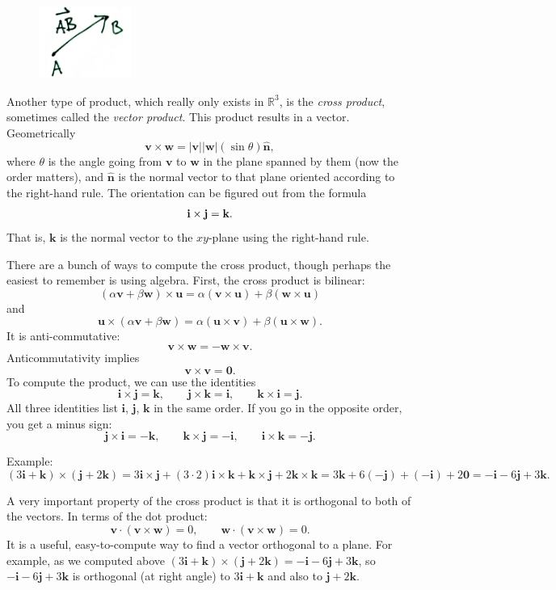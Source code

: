 \documentclass[12pt]{article}
\newcommand{\sabs}[1]{\lvert {#1} \rvert}
\newcommand{\R}{{\mathbb{R}}}
\newcommand{\veci}{\mathbf{i}}
\newcommand{\vecj}{\mathbf{j}}
\newcommand{\veck}{\mathbf{k}}
\newcommand{\avoidbreak}{\postdisplaypenalty=100}
\begin{document}
\begin{figure}
\vspace*{-0.2in}
\includegraphics[width=1.2in,page=3]{figures1}
\end{figure}
Another type of product, which really only exists in $\R^3$, is the
\emph{cross product},
sometimes called the \emph{vector product}.
This product results in a vector.
Geometrically
\[
\mathbf{v} \times \mathbf{w} = \sabs{\mathbf{v}} \sabs{\mathbf{w}} (\sin \theta) \hat{\mathbf{n}} ,
\]
where $\theta$ is the angle going from $\mathbf{v}$ to $\mathbf{w}$ in the plane spanned by them
(now the order matters),
and $\hat{\mathbf{n}}$ is the normal vector to that plane oriented according to the right-hand rule.
The orientation can be figured out from the formula
\[
\veci \times \vecj = \veck .
\avoidbreak
\]
That is, $\veck$ is the normal vector to the $xy$-plane using the right-hand rule.

There are a bunch of ways to compute the cross product, though perhaps the easiest to remember
is using algebra.
First, the cross product is bilinear:
\[
( \alpha \mathbf{v} + \beta \mathbf{w} ) \times \mathbf{u}
=
\alpha (\mathbf{v} \times \mathbf{u}) + \beta (\mathbf{w} \times \mathbf{u})
\]
and
\[
\mathbf{u} \times
( \alpha \mathbf{v} + \beta \mathbf{w} )
=
\alpha (\mathbf{u} \times \mathbf{v}) + \beta (\mathbf{u} \times \mathbf{w}) .
\]
It is anti-commutative:
\[
\mathbf{v} \times \mathbf{w} = - \mathbf{w} \times \mathbf{v} .
\]
Anticommutativity implies
\[
\mathbf{v} \times \mathbf{v} = \mathbf{0} .
\]
To compute the product, we can use the identities
\[
\veci \times \vecj = \veck , \qquad
\vecj \times \veck = \veci , \qquad
\veck \times \veci = \vecj .
\]
All three identities list $\veci$, $\vecj$, $\veck$ in the same order.
If you go in the opposite order, you get a minus sign:
\[
\vecj \times \veci = -\veck , \qquad
\veck \times \vecj = -\veci , \qquad
\veci \times \veck = -\vecj .
\]

Example:
\[
(3 \veci + \veck) \times (\vecj + 2 \veck)
=
3 \veci \times \vecj + (3 \cdot 2) \veci \times \veck
+
\veck \times \vecj + 2 \veck \times \veck
=
3 \veck + 6 ( - \vecj)
+
(-\veci) + 2 \mathbf{0}
=
-\veci - 6\vecj + 3 \veck .
\]

A very important property of the cross product is that it is orthogonal
to both of the vectors.
In terms of the dot product:
\[
\mathbf{v} \cdot (\mathbf{v} \times \mathbf{w}) = 0 , \qquad
\mathbf{w} \cdot (\mathbf{v} \times \mathbf{w}) = 0 .
\]
It is a useful, easy-to-compute way to find a vector orthogonal to a plane.
For example, as we computed above
$(3 \veci + \veck) \times (\vecj + 2 \veck)
=
-\veci - 6\vecj + 3 \veck$, so
$-\veci - 6\vecj + 3 \veck$ is orthogonal
(at right angle) to 
$3 \veci + \veck$ and also to
$\vecj + 2 \veck$.
\end{document}
